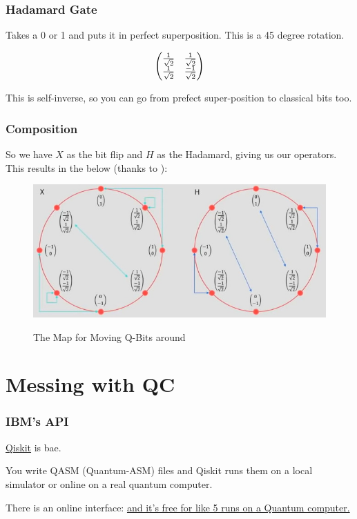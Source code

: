 \documentclass{beamer}
\begin{document}
\begin{frame}
\frametitle{Hadamard Gate}
Takes a 0 or 1 and puts it in perfect
superposition. This is a 45 degree
rotation.

\[
    \begin{pmatrix}
    {1 \over \sqrt{2}} & {1 \over \sqrt{2}}\\
    {1 \over \sqrt{2}} & {-1 \over \sqrt{2}}
    \end{pmatrix}
\]

This is self-inverse, so you can go from
prefect super-position to classical bits too.
\end{frame}

\begin{frame}
\frametitle{Composition}
So we have $X$ as the bit flip and
$H$ as the Hadamard, giving us our operators. This results in the below (thanks to \cite{img-blog}):
\begin{figure}
    \centering
    \includegraphics[width=.75\linewidth]{qt-unit-circle.jpg}
    \label{fig:qt-unit-circle}
    \caption{The Map for Moving Q-Bits around}
\end{figure}
\end{frame}

\section{Messing with QC}

\begin{frame}
\frametitle{IBM's API}
\href{https://qiskit.org/}{Qiskit} is bae.

You write QASM (Quantum-ASM) files and Qiskit runs them on a local simulator or online on a real quantum computer.

There is an online interface: \href{https://quantumexperience.ng.bluemix.net/qx/editor}{and it's free for like 5 runs on a Quantum computer.}
\end{frame}
\end{document}
